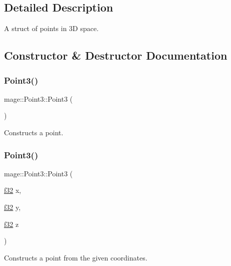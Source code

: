 \subsection{Detailed Description}
A struct of points in 3D space. 

\subsection{Constructor \& Destructor Documentation}
\hypertarget{structmage_1_1_point3_aab371cb187cadc61b81e5d09c8eed1e5}{}\label{structmage_1_1_point3_aab371cb187cadc61b81e5d09c8eed1e5} 
\subsubsection{\texorpdfstring{Point3()}{Point3()}\hspace{0.1cm}{\footnotesize\ttfamily [1/6]}}
{\footnotesize\ttfamily mage\+::\+Point3\+::\+Point3 (\begin{DoxyParamCaption}{ }\end{DoxyParamCaption})\hspace{0.3cm}{\ttfamily [noexcept]}}

Constructs a point. \hypertarget{structmage_1_1_point3_a554f2608040c6a715f36cb0fe862de1c}{}\label{structmage_1_1_point3_a554f2608040c6a715f36cb0fe862de1c} 
\subsubsection{\texorpdfstring{Point3()}{Point3()}\hspace{0.1cm}{\footnotesize\ttfamily [2/6]}}
{\footnotesize\ttfamily mage\+::\+Point3\+::\+Point3 (\begin{DoxyParamCaption}\item[{\hyperlink{namespacemage_a6a44ad388483959dc4dff9f2aef91431}{f32}}]{x,  }\item[{\hyperlink{namespacemage_a6a44ad388483959dc4dff9f2aef91431}{f32}}]{y,  }\item[{\hyperlink{namespacemage_a6a44ad388483959dc4dff9f2aef91431}{f32}}]{z }\end{DoxyParamCaption})\hspace{0.3cm}{\ttfamily [noexcept]}}

Constructs a point from the given coordinates.


